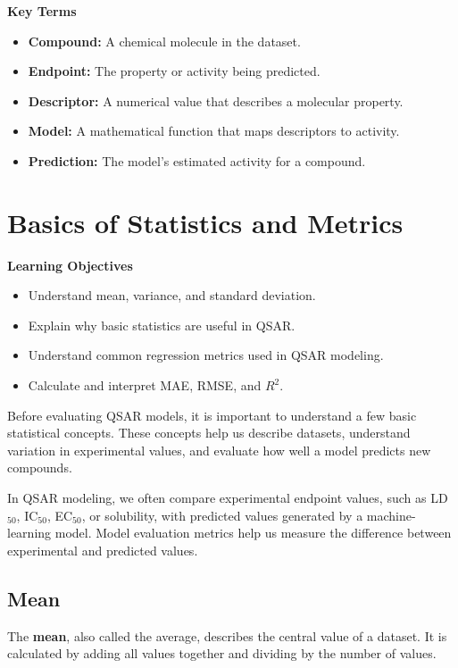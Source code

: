 \documentclass[11pt]{report}
\newenvironment{Important note}{\begin{quote}\color{red}\textbf{Important note:} }{\end{quote}}
\newenvironment{learningobjectives}
{\vspace{0.5em}\noindent\textbf{Learning Objectives}\begin{itemize}[leftmargin=*]}
{\end{itemize}\vspace{0.5em}}
\newenvironment{keyterms}
{\vspace{0.5em}\noindent\textbf{Key Terms}\begin{itemize}[leftmargin=*]}
{\end{itemize}\vspace{0.5em}}
\begin{document}
\begin{keyterms}
    \item \textbf{Compound:} A chemical molecule in the dataset.
    \item \textbf{Endpoint:} The property or activity being predicted.
    \item \textbf{Descriptor:} A numerical value that describes a molecular property.
    \item \textbf{Model:} A mathematical function that maps descriptors to activity.
    \item \textbf{Prediction:} The model's estimated activity for a compound.
\end{keyterms}



\chapter{Basics of Statistics and Metrics}

\begin{learningobjectives}
    \item Understand mean, variance, and standard deviation.
    \item Explain why basic statistics are useful in QSAR.
    \item Understand common regression metrics used in QSAR modeling.
    \item Calculate and interpret MAE, RMSE, and $R^2$.
\end{learningobjectives}

Before evaluating QSAR models, it is important to understand a few basic statistical concepts. These concepts help us describe datasets, understand variation in experimental values, and evaluate how well a model predicts new compounds.

In QSAR modeling, we often compare experimental endpoint values, such as LD$_{50}$, IC$_{50}$, EC$_{50}$, or solubility, with predicted values generated by a machine-learning model. Model evaluation metrics help us measure the difference between experimental and predicted values.

\section{Mean}

The \textbf{mean}, also called the average, describes the central value of a dataset. It is calculated by adding all values together and dividing by the number of values.
\end{document}
